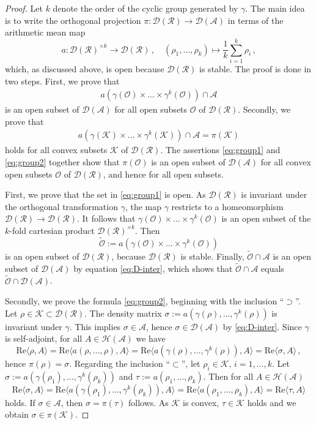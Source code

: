\documentclass[10pt,a4paper]{amsart}
\newcommand{\cA}{\mathcal{A}}
\newcommand{\cD}{\mathcal{D}}
\newcommand{\cH}{\mathcal{H}}
\newcommand{\cK}{\mathcal{K}}
\newcommand{\cO}{\mathcal{O}}
\newcommand{\cR}{\mathcal{R}}
\renewcommand\Re{\mathrm{Re}}
\begin{document}
\begin{proof}
Let $k$ denote the order of the cyclic group generated by $\gamma$. The main idea 
is to write the orthogonal projection $\pi:\cD(\cR)\to\cD(\cA)$ in terms of the 
arithmetic mean map
\[\textstyle
a:\cD(\cR)^{\times k}\to\cD(\cR)\,,
\quad
(\rho_1,\dots,\rho_k)\mapsto\frac{1}{k}\sum_{i=1}^k\rho_i\,,
\]
which, as discussed above, is open because $\cD(\cR)$ is stable. The proof is done 
in two steps. First, we prove that 
\begin{align}\label{eq:group1}
a(\gamma(\cO)\times\dots\times\gamma^k(\cO))\cap\cA
\end{align}
is an open subset of $\cD(\cA)$ for all open subsets $\cO$ of 
$\cD(\cR)$. Secondly, we prove that 
\begin{align}\label{eq:group2}
a(\gamma(\cK)\times\dots\times\gamma^k(\cK))\cap\cA=\pi(\cK)
\end{align}
holds for all convex subsets $\cK$ of $\cD(\cR)$. The assertions \eqref{eq:group1}
and \eqref{eq:group2} together show that $\pi(\cO)$ is an open subset of $\cD(\cA)$ 
for all convex open subsets $\cO$ of $\cD(\cR)$, and hence for all open subsets.
\par
%
First, we prove that the set in \eqref{eq:group1} is open. As $\cD(\cR)$ is 
invariant under the orthogonal transformation $\gamma$, the map $\gamma$ 
restricts to a homeomorphism $\cD(\cR)\to\cD(\cR)$. It follows that 
$\gamma(\cO)\times\dots\times\gamma^k(\cO)$ is an open subset of the $k$-fold 
cartesian product $\cD(\cR)^{\times k}$. Then
\[
\widetilde{\cO}:=a(\gamma(\cO)\times\dots\times\gamma^k(\cO))
\]
is an open subset of $\cD(\cR)$, because $\cD(\cR)$ is stable. Finally, 
$\widetilde{\cO}\cap\cA$ is an open subset of $\cD(\cA)$ by equation 
\eqref{eq:D-inter}, which shows that $\widetilde{\cO}\cap\cA$ equals 
$\widetilde{\cO}\cap\cD(\cA)$. 
\par
%
Secondly, we prove the formula \eqref{eq:group2}, beginning with the inclusion 
``$\supset$''. Let $\rho\in\cK\subset\cD(\cR)$. The density matrix
$\sigma:=a(\gamma(\rho),\dots,\gamma^k(\rho))$ is invariant under $\gamma$. 
This implies $\sigma\in\cA$, hence $\sigma\in\cD(\cA)$ by \eqref{eq:D-inter}. 
Since $\gamma$ is self-adjoint, for all $A\in\cH(\cA)$ we have
\[\textstyle
\Re\langle\rho,A\rangle
=\Re\langle a(\rho,\dots,\rho),A\rangle
=\Re\langle a(\gamma(\rho),\dots,\gamma^k(\rho)),A\rangle
=\Re\langle\sigma,A\rangle\,,
\]
hence $\pi(\rho)=\sigma$. Regarding the inclusion ``$\subset$'',
let $\rho_i\in\cK$, $i=1,\dots,k$. Let 
$\sigma:=a(\gamma(\rho_1),\dots,\gamma^k(\rho_k))$ and 
$\tau:=a(\rho_1,\dots,\rho_k)$. Then for all $A\in\cH(\cA)$
\[\textstyle
\Re\langle\sigma,A\rangle
=\Re\langle a(\gamma(\rho_1),\dots,\gamma^k(\rho_k)),A\rangle
=\Re\langle a(\rho_1,\dots,\rho_k),A\rangle
=\Re\langle\tau,A\rangle
\]
holds. If $\sigma\in\cA$, then $\sigma=\pi(\tau)$ follows. 
As $\cK$ is convex, $\tau\in\cK$ holds and we obtain $\sigma\in\pi(\cK)$.
\end{proof}
\end{document}

